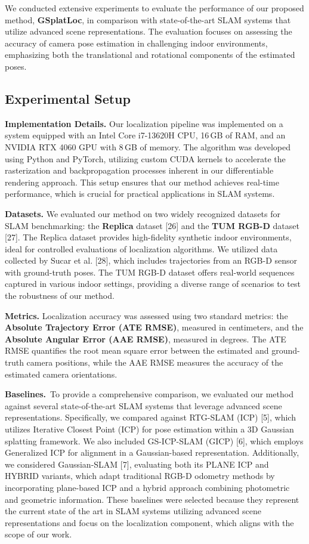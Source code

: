 \documentclass[twocolumn]{article} %
\begin{document}
We conducted extensive experiments to evaluate the performance of our
proposed method, \textbf{GSplatLoc}, in comparison with state-of-the-art
SLAM systems that utilize advanced scene representations. The evaluation
focuses on assessing the accuracy of camera pose estimation in
challenging indoor environments, emphasizing both the translational and
rotational components of the estimated poses.

\subsection{Experimental Setup}\label{experimental-setup}

\textbf{Implementation Details.} Our localization pipeline was
implemented on a system equipped with an Intel Core i7-13620H CPU,
16\,GB of RAM, and an NVIDIA RTX 4060 GPU with 8\,GB of memory. The
algorithm was developed using Python and PyTorch, utilizing custom CUDA
kernels to accelerate the rasterization and backpropagation processes
inherent in our differentiable rendering approach. This setup ensures
that our method achieves real-time performance, which is crucial for
practical applications in SLAM systems.

\textbf{Datasets.} We evaluated our method on two widely recognized
datasets for SLAM benchmarking: the \textbf{Replica} dataset {[}26{]}
and the \textbf{TUM RGB-D} dataset {[}27{]}. The Replica dataset
provides high-fidelity synthetic indoor environments, ideal for
controlled evaluations of localization algorithms. We utilized data
collected by Sucar et al. {[}28{]}, which includes trajectories from an
RGB-D sensor with ground-truth poses. The TUM RGB-D dataset offers
real-world sequences captured in various indoor settings, providing a
diverse range of scenarios to test the robustness of our method.

\textbf{Metrics.} Localization accuracy was assessed using two standard
metrics: the \textbf{Absolute Trajectory Error (ATE RMSE)}, measured in
centimeters, and the \textbf{Absolute Angular Error (AAE RMSE)},
measured in degrees. The ATE RMSE quantifies the root mean square error
between the estimated and ground-truth camera positions, while the AAE
RMSE measures the accuracy of the estimated camera orientations.

\textbf{Baselines.}~To provide a comprehensive comparison, we evaluated
our method against several state-of-the-art SLAM systems that leverage
advanced scene representations. Specifically, we compared against
RTG-SLAM (ICP) {[}5{]}, which utilizes Iterative Closest Point (ICP) for
pose estimation within a 3D Gaussian splatting framework. We also
included GS-ICP-SLAM (GICP) {[}6{]}, which employs Generalized ICP for
alignment in a Gaussian-based representation. Additionally, we
considered Gaussian-SLAM {[}7{]}, evaluating both its PLANE ICP and
HYBRID variants, which adapt traditional RGB-D odometry methods by
incorporating plane-based ICP and a hybrid approach combining
photometric and geometric information. These baselines were selected
because they represent the current state of the art in SLAM systems
utilizing advanced scene representations and focus on the localization
component, which aligns with the scope of our work.
\end{document}
